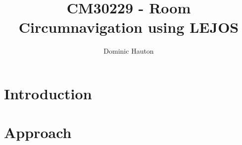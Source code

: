 \documentclass[a4paper,12pt]{report}
\title{CM30229 - Room Circumnavigation using LEJOS}
\author{Dominic Hauton}
\begin{document}
\maketitle

\begin{abstract}
\end{abstract}

\section{Introduction}




\section{Approach}

\end{document}
